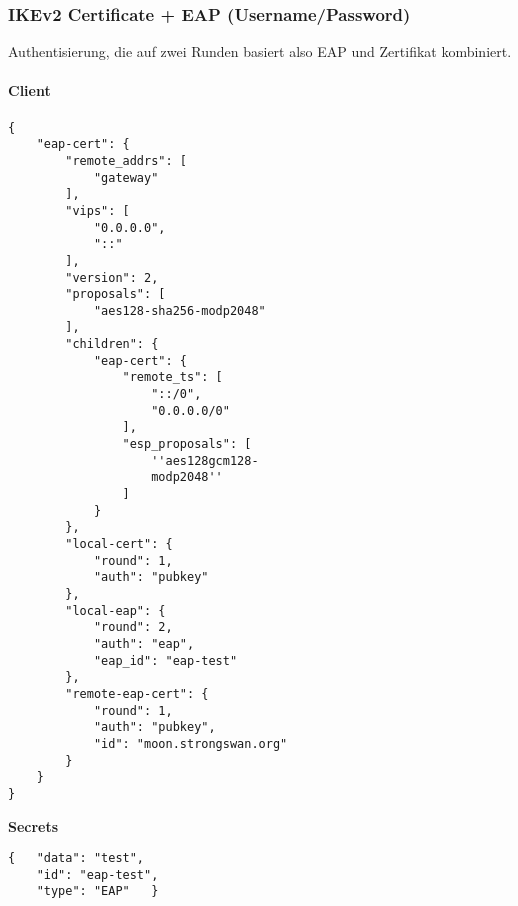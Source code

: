 \subsubsection{	IKEv2 Certificate + EAP (Username/Password)}
Authentisierung, die auf zwei Runden basiert also EAP und Zertifikat kombiniert.\\
\noindent\begin{minipage}[t]{0.5\textwidth}
\vspace{0pt}
\paragraph{Client}\mbox{}\medskip
\begin{lstlisting}[style=BashInputStyle]
{
    "eap-cert": {
        "remote_addrs": [
            "gateway"
        ],
        "vips": [
            "0.0.0.0",
            "::"
        ],
        "version": 2,
        "proposals": [
            "aes128-sha256-modp2048"
        ],
        "children": {
            "eap-cert": {
                "remote_ts": [
                    "::/0",
                    "0.0.0.0/0"
                ],
                "esp_proposals": [
                    ''aes128gcm128-
                    modp2048''
                ]
            }
        },
        "local-cert": {
            "round": 1,
            "auth": "pubkey"
        },
        "local-eap": {
            "round": 2,
            "auth": "eap",
            "eap_id": "eap-test"
        },
        "remote-eap-cert": {
            "round": 1,
            "auth": "pubkey",
            "id": "moon.strongswan.org"
        }
    }
}
\end{lstlisting}
\hspace*{18pt}\textbf{Secrets}\mbox{}\medskip
\begin{lstlisting}[style=BashInputStyle]
{   "data": "test",
    "id": "eap-test",
    "type": "EAP"   }
\end{lstlisting}
\end{minipage}
\hfill
